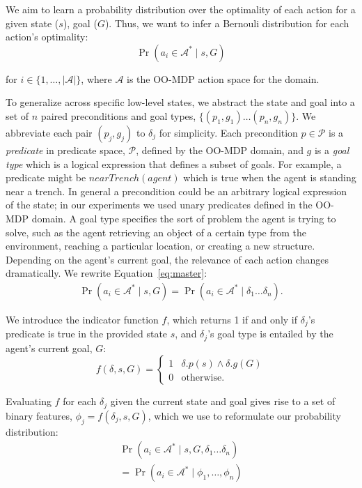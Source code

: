 \documentclass[letterpaper]{article}
\begin{document}
We aim to learn a probability distribution over the optimality of each action
for a given state ($s$), goal ($G$). Thus, we want to infer a Bernouli
distribution for each action's optimality:
\begin{equation}
\Pr(a_i \in \mathcal{A}^* \mid s, G)
\label{eq:master}
\end{equation}

\noindent for $i \in \{1, \ldots, |\mathcal{A}|\}$, where
$\mathcal{A}$ is the OO-MDP action space for the domain.

To generalize across specific low-level states, we abstract the state
and goal into a set of $n$ paired preconditions and goal types, $\{
(p_1, g_1) \ldots (p_{n}, g_{n}) \}$. We abbreviate each pair $(p_j,
g_j)$ to $\delta_j$ for simplicity. Each precondition $p \in
\mathcal{P}$ is a {\it predicate} in predicate space, $\mathcal{P}$,
defined by the OO-MDP domain, and $g$ is a {\it goal type} which is a
logical expression that defines a subset of goals. For example, a
predicate might be $nearTrench(agent)$ which is true when the agent is
standing near a trench.  In general a precondition could be an arbitrary
logical expression of the state; in our experiments we used unary
predicates defined in the OO-MDP domain.  A goal type specifies the
sort of problem the agent is trying to solve, such as the agent
retrieving an object of a certain type from the environment, reaching
a particular location, or creating a new structure.  Depending on the
agent's current goal, the relevance of each action changes
dramatically.  We rewrite Equation~\ref{eq:master}:
\begin{multline}
\Pr(a_i \in \mathcal{A}^* \mid s, G)
= \Pr(a_i \in \mathcal{A}^* \mid \delta_1 \ldots \delta_n).
\end{multline}

We introduce the indicator function $f$, which returns 1 if and only if $\delta_j$'s predicate is true in the provided state $s$, and $\delta_j$'s goal type is entailed by the agent's current goal, $G$:
\begin{equation}
f(\delta, s, G) = 
\begin{cases}
1& \delta.p(s) \wedge \delta.g(G) \\
0& \text{otherwise.}
\end{cases}
\label{eq:f_func_def}
\end{equation}

Evaluating $f$ for each $\delta_j$ given the current state and goal gives rise to a set of binary features,
$\phi_j = f(\delta_j, s, G)$, which we use to reformulate our probability distribution:
\begin{multline}
\Pr(a_i \in \mathcal{A}^*  \mid s, G, \delta_1 \ldots \delta_n) \\
= \Pr(a_i \in \mathcal{A}^*  \mid \phi_1, \ldots, \phi_n)
\label{eq:feature_rep}
\end{multline}
\end{document}
